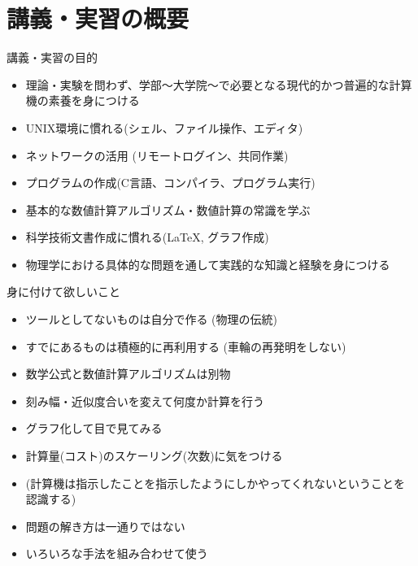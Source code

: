 \section{講義・実習の概要}

\begin{frame}[t]{講義・実習の目的}
  \begin{itemize}
  \item 理論・実験を問わず、学部〜大学院〜で必要となる現代的かつ普遍的な計算機の素養を身につける
  \item {\color{gray}UNIX環境に慣れる(シェル、ファイル操作、エディタ)}
  \item {\color{gray}ネットワークの活用 (リモートログイン、共同作業)}
  \item {\color{gray}プログラムの作成(C言語、コンパイラ、プログラム実行)}
  \item 基本的な数値計算アルゴリズム・数値計算の常識を学ぶ
  \item {\color{gray}科学技術文書作成に慣れる(\LaTeX, グラフ作成)}
  \item {\color{red}物理学における具体的な問題を通して実践的な知識と経験を身につける}
  \end{itemize}
\end{frame}

\begin{frame}[t]{身に付けて欲しいこと}
  \begin{itemize}
  \item ツールとしてないものは自分で作る (物理の伝統)
  \item すでにあるものは積極的に再利用する (車輪の再発明をしない)
  \item 数学公式と数値計算アルゴリズムは別物
  \item 刻み幅・近似度合いを変えて何度か計算を行う
  \item グラフ化して目で見てみる
  \item 計算量(コスト)のスケーリング(次数)に気をつける
  \item (計算機は指示したことを指示したようにしかやってくれないということを認識する)
  \item {\color{red}問題の解き方は一通りではない}
  \item {\color{red}いろいろな手法を組み合わせて使う}
  \end{itemize}
\end{frame}

